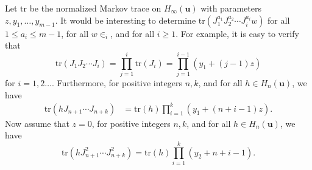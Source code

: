 \documentclass[a4paper, oneside]{amsart}
\numberwithin{equation}{section}
\theoremstyle{definition}
\theoremstyle{remark}
\begin{document}
Let $\mathrm{tr}$ be the normalized Markov trace on $H_{\infty}(\boldsymbol{u})$ with parameters $z, y_1,\ldots, y_{m-1}$. It would be interesting to determine $\mathrm{tr}(J_1^{a_1}J_2^{a_2}\cdots J_i^{a_i}w)$ for all $1\leq a_i\leq m-1$,  for all $w\in _i$, and for all $i\geq 1$. For example, it is easy to verify that
\begin{equation*}
 \mathrm{tr}(J_1J_2\cdots J_i)=\prod_{j=1}^i\mathrm{tr}(J_i)=\prod_{j=1}^{i-1}(y_1+(j-1)z)
\end{equation*}
for $i=1,2\ldots$.
Furthermore, for positive integers $n,k$, and for all $h\in H_{n}(\boldsymbol{u})$, we have
\begin{align*}
    \mathrm{tr}(hJ_{n+1}\cdots J_{n+k})&=\mathrm{tr}(h)\prod_{i=1}^k(y_1+(n+i-1)z).
\end{align*}
Now assume that $z=0$, for positive integers $n,k$, and for all $h\in H_{n}(\boldsymbol{u})$, we have
\begin{equation*}
 \mathrm{tr}(hJ_{n+1}^2\cdots J_{n+k}^2)=\mathrm{tr}(h)\prod_{i=1}^{k}(y_2+n+i-1).
\end{equation*}
\end{document}
